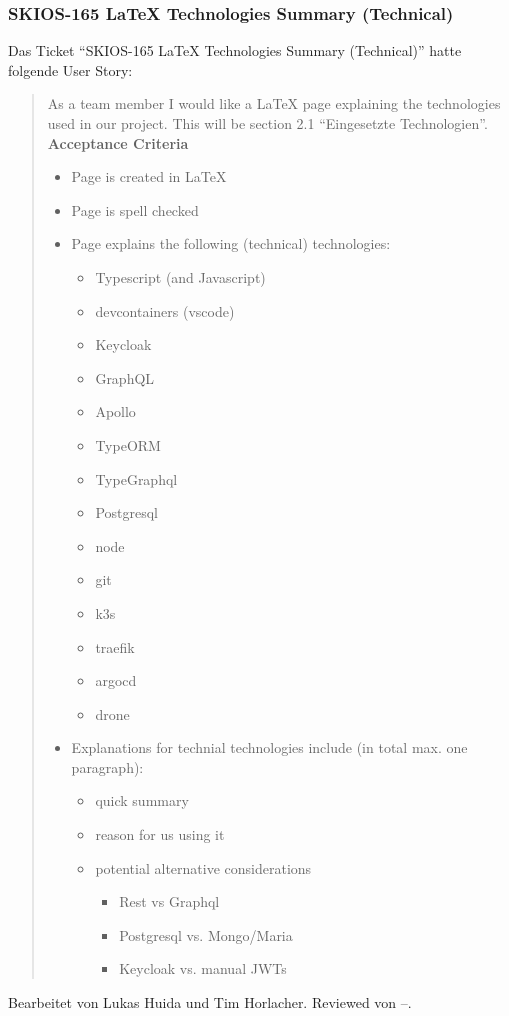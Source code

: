 \subsubsection{SKIOS-165 LaTeX Technologies Summary (Technical)}
Das Ticket \enquote{SKIOS-165 LaTeX Technologies Summary (Technical)} hatte folgende User Story:
\begin{quotation}
    As a team member I would like a LaTeX page explaining the technologies used in our project.
    This will be section 2.1 \enquote{Eingesetzte Technologien}. \\
\textbf{Acceptance Criteria}
\begin{itemize}
    \item Page is created in LaTeX
    \item Page is spell checked
    \item Page explains the following (technical) technologies:
    \begin{itemize}
        \item Typescript (and Javascript)
        \item devcontainers (vscode)
        \item Keycloak
        \item GraphQL
        \item Apollo
        \item TypeORM
        \item TypeGraphql
        \item Postgresql
        \item node
        \item git
        \item k3s
        \item traefik
        \item argocd
        \item drone
    \end{itemize}
    \item Explanations for technial technologies include (in total max. one paragraph):
    \begin{itemize}
        \item quick summary 
        \item reason for us using it
        \item potential alternative considerations 
        \begin{itemize}
            \item Rest vs Graphql
            \item Postgresql vs. Mongo/Maria
            \item Keycloak vs. manual JWTs
        \end{itemize}
    \end{itemize}
\end{itemize}
\end{quotation}
Bearbeitet von Lukas Huida und Tim Horlacher.
Reviewed von --.

